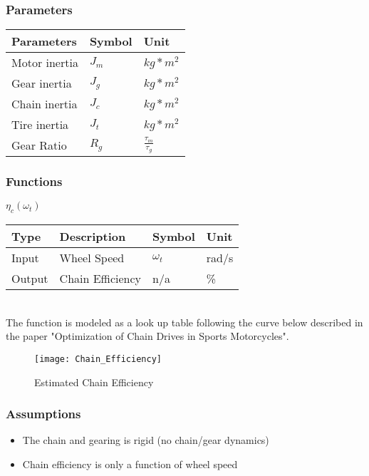 \documentclass[../SimBALink.tex]{subfiles}
\begin{document}
\subsubsection{Parameters}
	\begin{tabular}{ l | l | l  }
		Parameters					&	Symbol		&	Unit		\\	\hline
		Motor inertia		&	$J_m$		&	 $kg*m^2$ \\ 
		Gear inertia		&	$J_g$		&	 $kg*m^2$ \\ 
		Chain inertia		&	$J_c$		&	 $kg*m^2$ \\ 
		Tire inertia		&	$J_t$		&	 $kg*m^2$ \\ 
		Gear Ratio			&	$R_g$		&	$\frac{\tau_m}{\tau_g}$
	\end{tabular}
	
\subsubsection{Functions}
$\eta_c(\omega_t)$ \\
	\begin{tabular}{ l | l | l | l }
		Type				& Description		&	Symbol		&	Unit		\\	\hline
		Input 				& Wheel Speed		&	$\omega_t$  & 	rad/s		\\
		Output 				& Chain Efficiency	&	n/a			&	\%
	\end{tabular} \\

The function is modeled as a look up table following the curve below described in the paper "Optimization of Chain Drives in Sports Motorcycles".

\begin{figure}[h!]
  \centering
  \texttt{[image: Chain\_Efficiency]}
  \caption{Estimated Chain Efficiency}
\end{figure}

\subsubsection{Assumptions}
\begin{itemize}
  \item The chain and gearing is rigid (no chain/gear dynamics)
  \item Chain efficiency is only a function of wheel speed
\end{itemize}
\end{document}

